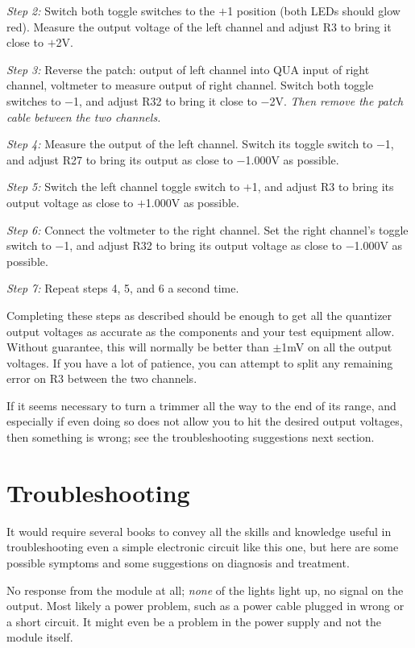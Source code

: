 \textit{Step 2:}  Switch both toggle switches to the $+$1 position (both
LEDs should glow red).  Measure the output voltage of the left channel and
adjust R3 to bring it close to $+$2V.

\textit{Step 3:}  Reverse the patch:  output of left channel into QUA input
of right channel, voltmeter to measure output of right channel.  Switch both
toggle switches to $-$1, and adjust R32 to bring it close to $-$2V. 
\emph{Then remove the patch cable between the two channels.}

\textit{Step 4:}  Measure the output of the left channel.  Switch its toggle
switch to $-$1, and adjust R27 to bring its output as close to $-$1.000V as
possible.

\textit{Step 5:}  Switch the left channel toggle switch to $+$1, and adjust
R3 to bring its output voltage as close to $+$1.000V as possible.

\textit{Step 6:}  Connect the voltmeter to the right channel.  Set the right
channel's toggle switch to $-$1, and adjust R32 to bring its output voltage
as close to $-$1.000V as possible.

\textit{Step 7:}  Repeat steps 4, 5, and 6 a second time.

Completing these steps as described should be enough to get all the quantizer
output voltages as accurate as the components and your test equipment allow.
Without guarantee, this will normally be better than $\pm$1mV on
all the output voltages.  If you have a lot of patience, you can attempt to
split any remaining error on R3 between the two channels.

If it seems necessary to turn a trimmer all the way to the end of its range,
and especially if even doing so does not allow you to hit the desired output
voltages, then something is wrong; see the troubleshooting suggestions next
section.

\section{Troubleshooting}

It would require several books to convey all the skills and knowledge useful
in troubleshooting even a simple electronic circuit like this one, but here
are some possible symptoms and some suggestions on diagnosis and treatment.

No response from the module at all; \emph{none} of the lights light up, no
signal on the output.  Most likely a power problem, such as a power cable
plugged in wrong or a short circuit.  It might even be a problem in the
power supply and not the module itself.

